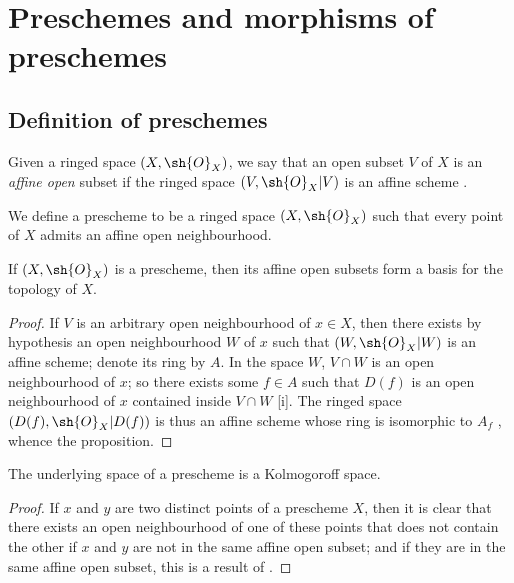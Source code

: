 \section{Preschemes and morphisms of preschemes}
\label{section:I.2}

\subsection{Definition of preschemes}
\label{subsection:I.2.1}

\begin{env}[2.1.1]
\label{I.2.1.1}
Given a ringed space $(X,\sh{O}_X)$, we say that an open subset $V$ of $X$ is an \emph{affine open} subset if the ringed space $(V,\sh{O}_X|V)$ is an affine scheme .
\end{env}

\begin{definition}[2.1.2]
\label{I.2.1.2}
We define a prescheme to be a ringed space $(X,\sh{O}_X)$ such that every point of $X$ admits an affine open neighbourhood.
\end{definition}

\begin{proposition}[2.1.3]
\label{I.2.1.3}
If $(X,\sh{O}_X)$ is a prescheme, then its affine open subsets form a basis for the topology of $X$.
\end{proposition}

\begin{proof}
If $V$ is an arbitrary open neighbourhood of $x\in X$, then there exists by hypothesis an open neighbourhood $W$ of $x$ such that $(W,\sh{O}_X|W)$ is an affine scheme;
denote its ring by $A$.
In the space $W$, $V\cap W$ is an open neighbourhood of $x$;
so there exists some $f\in A$ such that $D(f)$ is an open neighbourhood of $x$ contained inside $V\cap W$ [i].
The ringed space $(D(f),\sh{O}_X|D(f))$ is thus an affine scheme whose ring is isomorphic to $A_f$ , whence the proposition.
\end{proof}

\begin{proposition}[2.1.4]
\label{I.2.1.4}
The underlying space of a prescheme is a Kolmogoroff space.
\end{proposition}

\begin{proof}
If $x$ and $y$ are two distinct points of a prescheme $X$, then it is clear that there exists an open neighbourhood of one of these points that does not contain the other if $x$ and $y$ are not in the same affine open subset; and if they are in the same affine open subset, this is a result of .
\end{proof}


